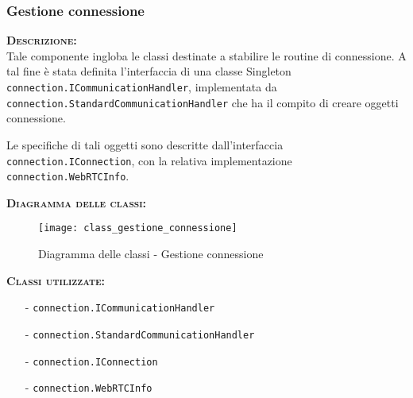 \subsubsection{Gestione connessione}
\begin{description}
	\item{\scshape\bfseries Descrizione:}\\
Tale componente ingloba le classi destinate a stabilire le routine di connessione. A tal fine è stata definita l'interfaccia di una classe Singleton \texttt{connection.ICommunicationHandler}, implementata da \texttt{connection.StandardCommunicationHandler} che ha il compito di creare oggetti connessione.

Le specifiche di tali oggetti sono descritte dall'interfaccia \texttt{connection.IConnection}, con la relativa implementazione \texttt{connection.WebRTCInfo}.
	\item{\scshape\bfseries Diagramma delle classi:}
	\begin{figure}[H]
\begin{center}
\texttt{[image: class\_gestione\_connessione]}
\caption{Diagramma delle classi - Gestione connessione}\label{fig:gestione_connessione}
\end{center}
\end{figure}
	
	\item{\scshape\bfseries Classi utilizzate:}
	\begin{itemize}[nolistsep, noitemsep]
	  \item[-] \texttt{connection.ICommunicationHandler}
	  \item[-] \texttt{connection.StandardCommunicationHandler}
	  \item[-] \texttt{connection.IConnection}
	  \item[-] \texttt{connection.WebRTCInfo}
	\end{itemize}
\end{description}

